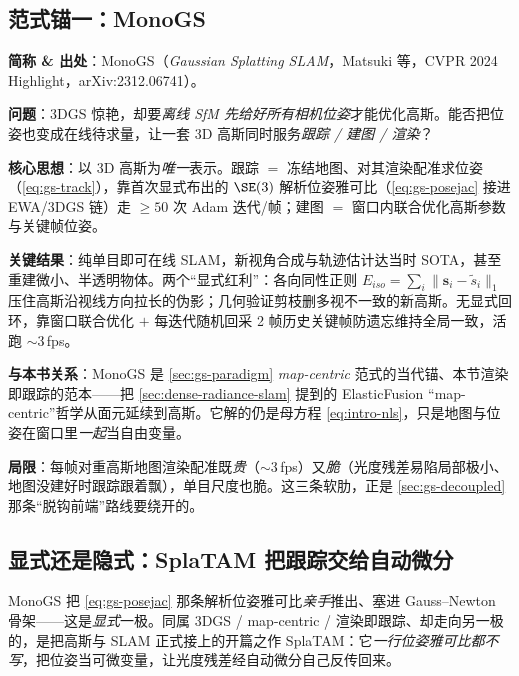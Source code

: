 \subsection{范式锚一：MonoGS}

\begin{paper}
\textbf{简称 \& 出处}：MonoGS（\emph{Gaussian Splatting SLAM}，Matsuki 等，CVPR 2024 Highlight，arXiv:2312.06741）\cite{matsuki2024monogs}。

\textbf{问题}：3DGS \cite{kerbl2023gaussian} 惊艳，却要\emph{离线 SfM 先给好所有相机位姿}才能优化高斯。能否把位姿也变成在线待求量，让一套 3D 高斯同时服务\emph{跟踪 / 建图 / 渲染}？

\textbf{核心思想}：以 3D 高斯为\emph{唯一}表示。跟踪 $=$ 冻结地图、对其渲染配准求位姿（\cref{eq:gs-track}），靠首次显式布出的 $\SE(3)$ 解析位姿雅可比（\cref{eq:gs-posejac} 接进 EWA/3DGS 链）走 $\ge\!50$ 次 Adam 迭代/帧；建图 $=$ 窗口内联合优化高斯参数与关键帧位姿。

\textbf{关键结果}：纯单目即可在线 SLAM，新视角合成与轨迹估计达当时 SOTA，甚至重建微小、半透明物体。两个“显式红利”：各向同性正则 $E_{iso}=\sum_i\lVert\mathbf s_i-\tilde s_i\rVert_1$ 压住高斯沿视线方向拉长的伪影；几何验证剪枝删多视不一致的新高斯。无显式回环，靠窗口联合优化 $+$ 每迭代随机回采 2 帧历史关键帧防遗忘维持全局一致，活跑 $\sim\!3$\,fps。

\textbf{与本书关系}：MonoGS 是 \cref{sec:gs-paradigm} \emph{map-centric} 范式的当代锚、本节渲染即跟踪的范本——把 \cref{sec:dense-radiance-slam} 提到的 ElasticFusion “map-centric”哲学从面元延续到高斯。它解的仍是母方程 \cref{eq:intro-nls}，只是地图与位姿在窗口里\emph{一起}当自由变量。

\textbf{局限}：每帧对重高斯地图渲染配准既\emph{贵}（$\sim\!3$\,fps）又\emph{脆}（光度残差易陷局部极小、地图没建好时跟踪跟着飘），单目尺度也脆。这三条软肋，正是 \cref{sec:gs-decoupled} 那条“脱钩前端”路线要绕开的。
\end{paper}

\subsection{显式还是隐式：SplaTAM 把跟踪交给自动微分}

MonoGS 把 \cref{eq:gs-posejac} 那条解析位姿雅可比\emph{亲手}推出、塞进 Gauss--Newton 骨架——这是\emph{显式}一极。同属 3DGS / map-centric / 渲染即跟踪、却走向另一极的，是把高斯与 SLAM 正式接上的开篇之作 SplaTAM：它\emph{一行位姿雅可比都不写}，把位姿当可微变量，让光度残差经自动微分自己反传回来。

